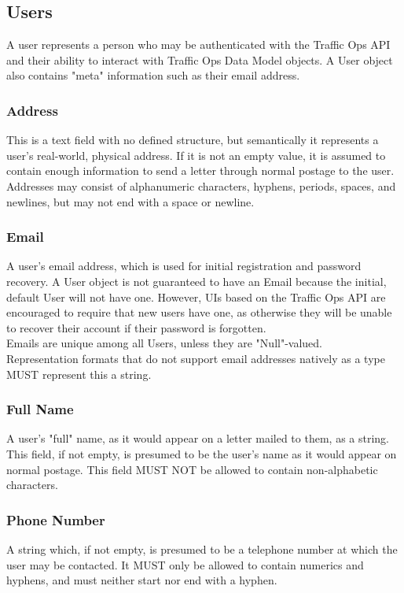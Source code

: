 \subsection{Users\label{sec:users}}
A user represents a person who may be authenticated with the Traffic Ops API and
their ability to interact with Traffic Ops Data Model objects. A User object
also contains "meta" information such as their email address.

\subsubsection{Address}
This is a text field with no defined structure, but semantically it represents a
user's real-world, physical address. If it is not an empty value, it is assumed
to contain enough information to send a letter through normal postage to the
user.\\
Addresses may consist of alphanumeric characters, hyphens, periods, spaces, and
newlines, but may not end with a space or newline.

\subsubsection{Email}
A user's email address, which is used for initial registration and password
recovery. A User object is not guaranteed to have an Email because the initial,
default User will not have one. However, UIs based on the Traffic Ops API are
encouraged to require that new users have one, as otherwise they will be unable
to recover their account if their password is forgotten.\\
Emails are unique among all Users, unless they are "Null"-valued.\\
Representation formats that do not support email addresses natively as a type
MUST represent this a string.

\subsubsection{Full Name}
A user's "full" name, as it would appear on a letter mailed to them, as a
string. This field, if not empty, is presumed to be the user's name as it would
appear on normal postage. This field MUST NOT be allowed to contain
non-alphabetic characters.

\subsubsection{Phone Number}
A string which, if not empty, is presumed to be a telephone number at which the
user may be contacted. It MUST only be allowed to contain numerics and hyphens,
and must neither start nor end with a hyphen.

